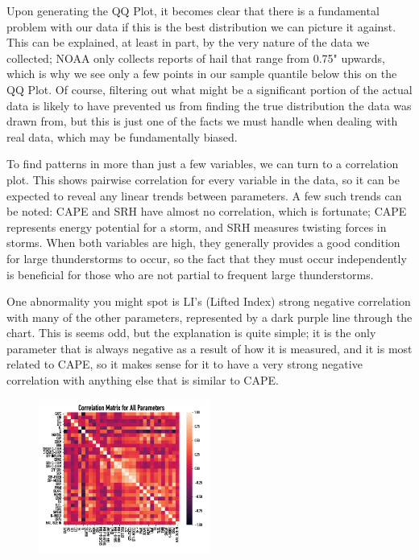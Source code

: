 \documentclass[fleqn,10pt]{SelfArx} %
\begin{document}
Upon generating the QQ Plot, it becomes clear that there is a fundamental problem with our data if this is the best distribution we can picture it against. This can be explained, at least in part, by the very nature of the data we collected; NOAA only collects reports of hail that range from 0.75" upwards, which is why we see only a few points in our sample quantile below this on the QQ Plot. Of course, filtering out what might be a significant portion of the actual data is likely to have prevented us from finding the true distribution the data was drawn from, but this is just one of the facts we must handle when dealing with real data, which may be fundamentally biased.

To find patterns in more than just a few variables, we can turn to a correlation plot. This shows pairwise correlation for every variable in the data, so it can be expected to reveal any linear trends between parameters. A few such trends can be noted: CAPE and SRH have almost no correlation, which is fortunate; CAPE represents energy potential for a storm, and SRH measures twisting forces in storms. When both variables are high, they generally provides a good condition for large thunderstorms to occur, so the fact that they must occur independently is beneficial for those who are not partial to frequent large thunderstorms.

One abnormality you might spot is LI's (Lifted Index) strong negative correlation with many of the other parameters, represented by a dark purple line through the chart. This is seems odd, but the explanation is quite simple; it is the only parameter that is always negative as a result of how it is measured, and it is most related to CAPE, so it makes sense for it to have a very strong negative correlation with anything else that is similar to CAPE. 

\begin{figure}[H]
\includegraphics[width=0.5\textwidth, center=8.5cm]{"plots/all_corrs.png"} 
\end{figure}
\end{document}
